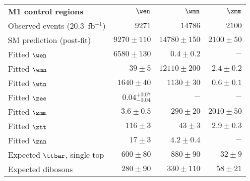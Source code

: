 \begin{table}[!ht]
\begin{center}
\setlength{\tabcolsep}{0.0pc}
{\footnotesize
    \begin{tabular*}{\textwidth}{@{\extracolsep{\fill}}lrrr}
  \noalign{\smallskip}\hline\noalign{\smallskip}
  {\bf  M1 control regions}           & $\wen$            & $\wmn$            & $\zmm$              \\[-0.05cm]
    \noalign{\smallskip}\hline\noalign{\smallskip}
    Observed  events (20.3~fb${}^{-1}$)    & $9271$              & $14786$              & $2100$ \\
    \noalign{\smallskip}\hline\noalign{\smallskip}
    SM prediction (post-fit)    & $9270 \pm 110$          & $14780 \pm 150$          & $2100 \pm 50$              \\                 
    \noalign{\smallskip}\hline\noalign{\smallskip}
    Fitted $\wen$          & $6580 \pm 130$          & $0.4 \pm 0.2$          & $-$              \\
    Fitted $\wmn$          & $39 \pm 5$          & $12110 \pm 200$          & $2.4 \pm 0.2$              \\
    Fitted $\wtn$          & $1640 \pm 40$          & $1130 \pm 30$          & $0.6 \pm 0.1$              \\
    Fitted $\zee$          & $0.04_{-0.04}^{+0.07}$          & $-$          & $-$              \\
    Fitted $\zmm$          & $3.6 \pm 0.5$          & $290 \pm 20$          & $2010 \pm 50$              \\
    Fitted $\ztt$          & $116 \pm 3$          & $43 \pm 3$          & $2.9 \pm 0.3$              \\
    Fitted $\znn$          & $17 \pm 3$          & $4.2 \pm 0.4$          & $-$              \\
    Expected $\ttbar$, single top          & $600 \pm 80$          & $880 \pm 90$          & $32 \pm 9$              \\
    Expected  dibosons         & $280 \pm 90$          & $330 \pm 110$          & $58 \pm 21$              \\

\end{tabular*}}
\end{center}
\end{table}
